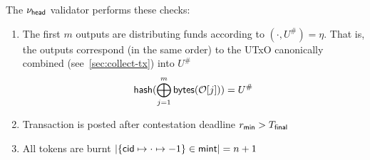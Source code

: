 \noindent The $\nu_\mathsf{head}$ validator performs these checks:
\begin{enumerate}
  \item The first $m$ outputs are distributing funds according to
        $(\cdot, U^{\#}) = \eta$. That is, the outputs correspond (in the same
        order) to the UTxO canonically combined (see~\ref{sec:collect-tx}) into
        $U^{\#}$
        \[
        \mathsf{hash}(\bigoplus_{j=1}^{m} \mathsf{bytes}(\mathcal{O}[j])) = U^{\#}
        \]
  \item Transaction is posted after contestation deadline $r_{\mathsf{min}} > T_{\mathsf{final}}$
  \item All tokens are burnt
        $|\{\mathsf{cid} \mapsto \cdot \mapsto -1\} \in \mathsf{mint}| = n + 1$
\end{enumerate}

